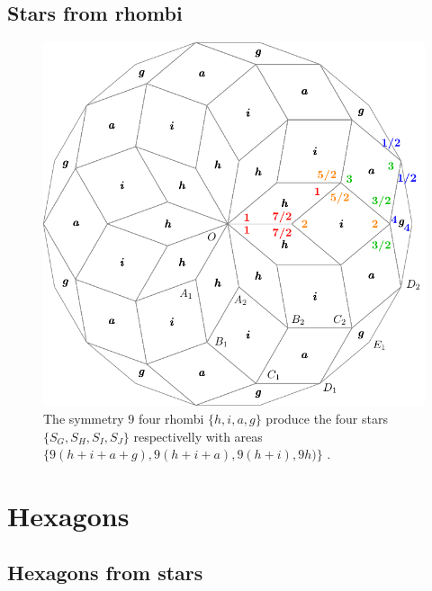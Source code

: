 \documentclass[11pt]{article}
\begin{document}
\subsection{Stars from rhombi}

\begin{figure}[H]
\centering
\includegraphics[scale=1]{rhombi-9}
\caption{The symmetry $9$ four rhombi $\{h,i,a,g\}$ produce the four stars $\{S_G,S_H,S_I,S_J\}$ respectivelly with areas $\{9(h+i+a+g),9(h+i+a),9(h+i),9h)\}$ .}
\label{fig:rhombi-9}
\end{figure}

\section{Hexagons}

\subsection{Hexagons from stars}
\end{document}
